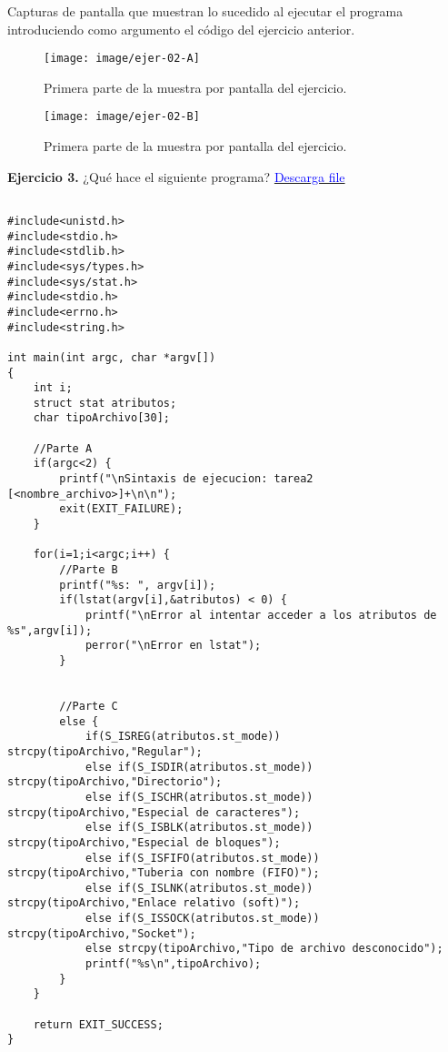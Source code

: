 Capturas de pantalla que muestran lo sucedido al ejecutar el programa introduciendo como argumento el código del ejercicio anterior. \newline

\begin{figure}[H]
	\centering
	\texttt{[image: image/ejer-02-A]}
	\caption[Ejercicio 2. A]{Primera parte de la muestra por pantalla del ejercicio.}
	\label{fig:ejer-02-a}
\end{figure}

\begin{figure}[H]
	\centering
	\texttt{[image: image/ejer-02-B]}
	\caption[Ejercicio 2. B]{Primera parte de la muestra por pantalla del ejercicio.}
	\label{fig:ejer-02-b}
\end{figure}

{\Large \textbf{Ejercicio 3.}} ¿Qué hace el siguiente programa? \href{file: file/tarea2.c}{\textcolor{Blue}{Descarga file}}

\lstset{language=, breaklines=true, basicstyle=\footnotesize}
\begin{lstlisting}[frame=single]

#include<unistd.h>  
#include<stdio.h>
#include<stdlib.h>
#include<sys/types.h>  
#include<sys/stat.h>
#include<stdio.h>
#include<errno.h>
#include<string.h>

int main(int argc, char *argv[])
{
	int i;
	struct stat atributos;
	char tipoArchivo[30];
	
	//Parte A
	if(argc<2) {
		printf("\nSintaxis de ejecucion: tarea2 [<nombre_archivo>]+\n\n");
		exit(EXIT_FAILURE);
	}
	
	for(i=1;i<argc;i++) {
		//Parte B
		printf("%s: ", argv[i]);
		if(lstat(argv[i],&atributos) < 0) {
			printf("\nError al intentar acceder a los atributos de %s",argv[i]);
			perror("\nError en lstat");
		}
		
			
		//Parte C		
		else {
			if(S_ISREG(atributos.st_mode)) strcpy(tipoArchivo,"Regular");
			else if(S_ISDIR(atributos.st_mode)) strcpy(tipoArchivo,"Directorio");
			else if(S_ISCHR(atributos.st_mode)) strcpy(tipoArchivo,"Especial de caracteres");
			else if(S_ISBLK(atributos.st_mode)) strcpy(tipoArchivo,"Especial de bloques");
			else if(S_ISFIFO(atributos.st_mode)) strcpy(tipoArchivo,"Tuberia con nombre (FIFO)");
			else if(S_ISLNK(atributos.st_mode)) strcpy(tipoArchivo,"Enlace relativo (soft)");
			else if(S_ISSOCK(atributos.st_mode)) strcpy(tipoArchivo,"Socket");
			else strcpy(tipoArchivo,"Tipo de archivo desconocido");
			printf("%s\n",tipoArchivo);
		}
	}
	
	return EXIT_SUCCESS;
}
\end{lstlisting}

